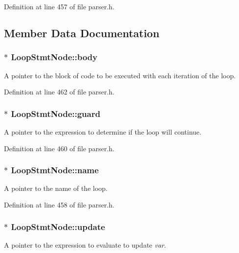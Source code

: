 Definition at line 457 of file parser.\-h.



\subsection{Member Data Documentation}
\hypertarget{struct_loop_stmt_node_a6844fd9206ed5d6b4fd48fc1365969aa}{
\subsubsection[{body}]{$\ast$ {\bf Loop\-Stmt\-Node\-::body}}}\label{struct_loop_stmt_node_a6844fd9206ed5d6b4fd48fc1365969aa}
A pointer to the block of code to be executed with each iteration of the loop. 

Definition at line 462 of file parser.\-h.

\hypertarget{struct_loop_stmt_node_a53a86fb7f989cf43f54192b8f3ad6c1a}{
\subsubsection[{guard}]{$\ast$ {\bf Loop\-Stmt\-Node\-::guard}}}\label{struct_loop_stmt_node_a53a86fb7f989cf43f54192b8f3ad6c1a}
A pointer to the expression to determine if the loop will continue. 

Definition at line 460 of file parser.\-h.

\hypertarget{struct_loop_stmt_node_a36b401d6c4fd2c16a68de026b99187f3}{
\subsubsection[{name}]{$\ast$ {\bf Loop\-Stmt\-Node\-::name}}}\label{struct_loop_stmt_node_a36b401d6c4fd2c16a68de026b99187f3}
A pointer to the name of the loop. 

Definition at line 458 of file parser.\-h.

\hypertarget{struct_loop_stmt_node_a0400ab555fff51b09f79c495af20f37f}{
\subsubsection[{update}]{$\ast$ {\bf Loop\-Stmt\-Node\-::update}}}\label{struct_loop_stmt_node_a0400ab555fff51b09f79c495af20f37f}
A pointer to the expression to evaluate to update {\itshape var\/}. 

